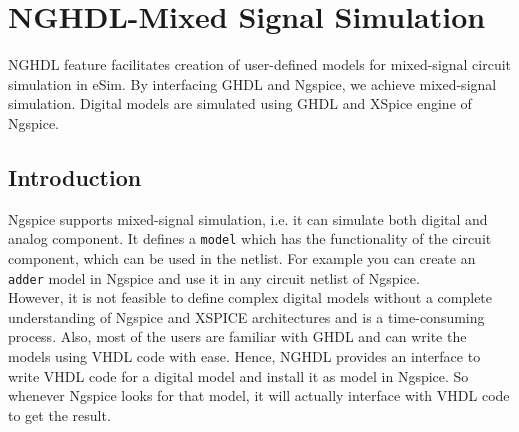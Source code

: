 \chapter{NGHDL-Mixed Signal Simulation}
\label{chap9}
\thispagestyle{empty}


NGHDL feature facilitates creation of user-defined models for mixed-signal circuit simulation in eSim. By interfacing GHDL and Ngspice, we achieve mixed-signal simulation. Digital models are simulated using GHDL and XSpice engine of Ngspice. \\



\section{Introduction}

Ngspice supports mixed-signal simulation, i.e. it can simulate both digital and analog component. It defines a \texttt{model} which has the functionality of the circuit component, which can be used in the netlist.
For example you can create an \texttt{adder} model in Ngspice and use it in any circuit netlist of Ngspice. \\

However, it is not feasible to define complex digital models without a complete understanding of Ngspice and XSPICE architectures and is a time-consuming process. Also, most of the users are familiar with GHDL and can write the models using VHDL code with ease.
Hence, NGHDL provides an  interface to write VHDL code for a digital model and install it as model in Ngspice. So whenever Ngspice looks for that model, it will actually interface with VHDL code to get the result. \\

